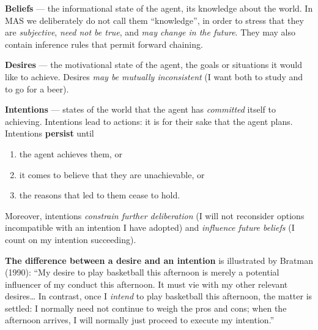 \documentclass[11pt,a4paper]{article}
\theoremstyle{definition}
\providecommand{\uv}[1]{``#1''}
\begin{document}
\begin{defbox}
\textbf{Beliefs} --- the informational state of the agent, its knowledge about the world.
In MAS we deliberately do not call them \uv{knowledge}, in order to stress that they are
\emph{subjective}, \emph{need not be true}, and \emph{may change in the future}. They may also
contain inference rules that permit forward chaining.

\textbf{Desires} --- the motivational state of the agent, the goals or situations it would like to
achieve. Desires \emph{may be mutually inconsistent} (I want both to study and to go for a beer).

\textbf{Intentions} --- states of the world that the agent has \emph{committed} itself to achieving.
Intentions lead to actions: it is for their sake that the agent plans. Intentions \textbf{persist}
until
\begin{enumerate}
\item the agent achieves them, or
\item it comes to believe that they are unachievable, or
\item the reasons that led to them cease to hold.
\end{enumerate}
Moreover, intentions \emph{constrain further deliberation} (I will not reconsider options
incompatible with an intention I have adopted) and \emph{influence future beliefs} (I count on my
intention succeeding).
\end{defbox}

\noindent\textbf{The difference between a desire and an intention} is illustrated by Bratman (1990):
\uv{My desire to play basketball this afternoon is merely a potential influencer of my conduct this
afternoon. It must vie with my other relevant desires\dots{} In contrast, once I
\emph{intend} to play basketball this afternoon, the matter is settled: I normally need not continue
to weigh the pros and cons; when the afternoon arrives, I will normally just proceed to execute my
intention.}
\end{document}
